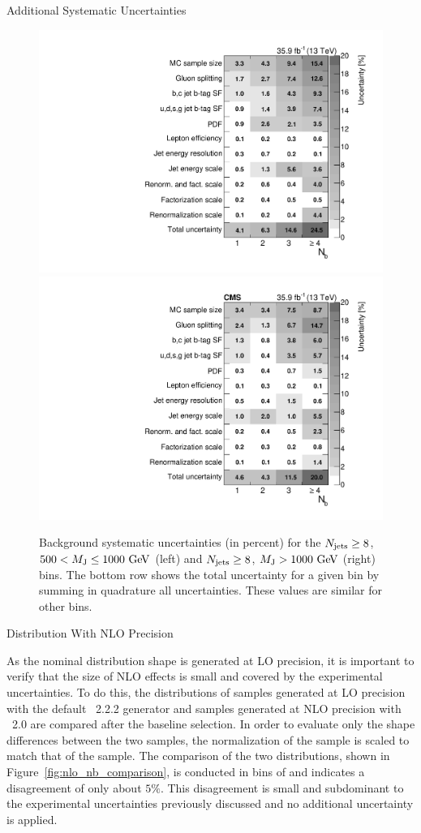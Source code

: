 \begin{section}{Additional Systematic Uncertainties}
\begin{figure}[tbp!]
\begin{center}
\includegraphics[angle=0,width=0.45\columnwidth]{fig/table_bkg_systs_bin20.pdf}
\includegraphics[angle=0,width=0.45\columnwidth]{fig/table_bkg_systs_bin21.pdf}
\end{center}
\caption{Background systematic uncertainties (in percent) for the $N_{\mathrm{jets}} \geq 8$, $500 < M_{\mathrm{J}} \leq 1000~\mathrm{Ge\kern -0.1em V}$ (left) and $N_{\mathrm{jets}} \geq 8$, $M_{\mathrm{J}} > 1000~\mathrm{Ge\kern -0.1em V}$ (right) bins.
The bottom row shows the total uncertainty for a given \Nb bin by summing in quadrature all uncertainties.
These values are similar for other bins.}
\label{fig:bkg_sys_tables}
\end{figure}

\begin{subsection}{\Nb Distribution With NLO Precision}

As the nominal \Nb distribution shape is generated at LO precision, it is important to verify that the size of NLO effects is small and covered by the experimental uncertainties.
To do this, the \Nb distributions of \ttbar samples generated at LO precision with the default \MGatNLO~2.2.2 generator and samples generated at NLO precision with \POWHEG~2.0 are compared after the baseline selection.
In order to evaluate only the shape differences between the two samples, the normalization of the \MGatNLO sample is scaled to match that of the \POWHEG sample.
The comparison of the two distributions, shown in Figure~\ref{fig:nlo_nb_comparison}, is conducted in bins of \Njets and indicates a disagreement of only about $5\%$.
This disagreement is small and subdominant to the experimental uncertainties previously discussed and no additional uncertainty is applied.


\end{subsection}
\end{section}
